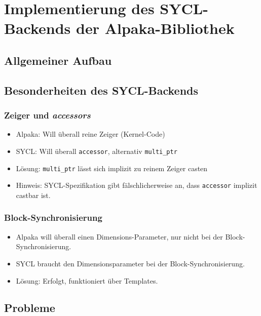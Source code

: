 \chapter{Implementierung des SYCL-Backends der Alpaka-Bibliothek}
\label{implementierung}

\section{Allgemeiner Aufbau}
\label{implementierung:aufbau}

\section{Besonderheiten des SYCL-Backends}
\label{implementierung:besonderheiten}

\subsection{Zeiger und \textit{accessors}}
\label{implementierung:besonderheiten:zeiger}

\begin{itemize}
    \item Alpaka: Will überall reine Zeiger (Kernel-Code)
    \item SYCL: Will überall \texttt{accessor}, alternativ \texttt{multi\_ptr}
    \item Lösung: \texttt{multi\_ptr} lässt sich implizit zu reinem Zeiger casten
    \item Hinweis: SYCL-Spezifikation gibt fälschlicherweise an, dass
          \texttt{accessor} implizit castbar ist.
\end{itemize}

\subsection{Block-Synchronisierung}
\label{implementierung:besonderheiten:synchronisierung}

\begin{itemize}
    \item Alpaka will überall einen Dimensions-Parameter, nur nicht bei der
          Block-Synchronisierung.
    \item SYCL braucht den Dimensionsparameter bei der Block-Synchronisierung.
    \item Lösung: Erfolgt, funktioniert über Templates.
\end{itemize}

\section{Probleme}\label{implementierung:probleme}

